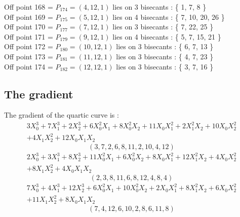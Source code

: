 \documentclass{article}
\begin{document}
{Off point 168 = $P_{174} = ( 4, 12, 1 )$ lies on 3 bisecants : \{ 1, 7, 8 \}\\
Off point 169 = $P_{175} = ( 5, 12, 1 )$ lies on 4 bisecants : \{ 7, 10, 20, 26 \}\\
Off point 170 = $P_{177} = ( 7, 12, 1 )$ lies on 3 bisecants : \{ 7, 22, 25 \}\\
Off point 171 = $P_{179} = ( 9, 12, 1 )$ lies on 4 bisecants : \{ 5, 7, 15, 21 \}\\
Off point 172 = $P_{180} = ( 10, 12, 1 )$ lies on 3 bisecants : \{ 6, 7, 13 \}\\
Off point 173 = $P_{181} = ( 11, 12, 1 )$ lies on 3 bisecants : \{ 4, 7, 23 \}\\
Off point 174 = $P_{182} = ( 12, 12, 1 )$ lies on 3 bisecants : \{ 3, 7, 16 \}\\
\subsection*{The gradient}
The gradient of the quartic curve  is :
$$
\begin{array}{c}
3X_0^3 + 7X_1^3 + 2X_2^3 + 6X_0^2X_1 + 8X_0^2X_2 + 11X_0X_1^2 + 2X_1^2X_2 + 10X_0X_2^2\\
 + 4X_1X_2^2 + 12X_0X_1X_2\end{array}
$$
$$
( 3, 7, 2, 6, 8, 11, 2, 10, 4, 12 )$$
$$
\begin{array}{c}
2X_0^3 + 3X_1^3 + 8X_2^3 + 11X_0^2X_1 + 6X_0^2X_2 + 8X_0X_1^2 + 12X_1^2X_2 + 4X_0X_2^2\\
 + 8X_1X_2^2 + 4X_0X_1X_2\end{array}
$$
$$
( 2, 3, 8, 11, 6, 8, 12, 4, 8, 4 )$$
$$
\begin{array}{c}
7X_0^3 + 4X_1^3 + 12X_2^3 + 6X_0^2X_1 + 10X_0^2X_2 + 2X_0X_1^2 + 8X_1^2X_2 + 6X_0X_2^2\\
 + 11X_1X_2^2 + 8X_0X_1X_2\end{array}
$$
$$
( 7, 4, 12, 6, 10, 2, 8, 6, 11, 8 )$$


%


%


}%
\end{document}
